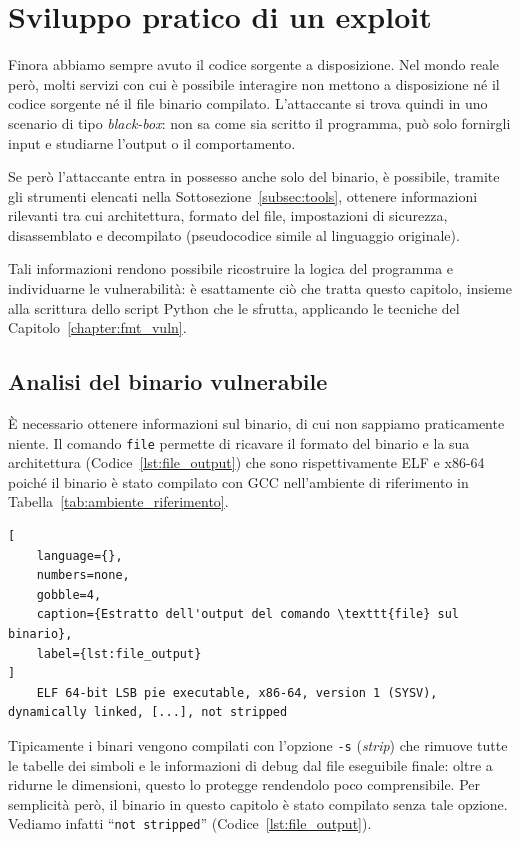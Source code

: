 \chapter{Sviluppo pratico di un exploit}\label{chapter:exploit}
Finora abbiamo sempre avuto il codice sorgente a disposizione. Nel mondo reale però, molti servizi con cui è possibile interagire non mettono a disposizione né il codice sorgente né il file binario compilato. L'attaccante si trova quindi in uno scenario di tipo \emph{black-box}: non sa come sia scritto il programma, può solo fornirgli input e studiarne l'output o il comportamento.

Se però l'attaccante entra in possesso anche solo del binario, è possibile, tramite gli strumenti elencati nella Sottosezione~\ref{subsec:tools}, ottenere informazioni rilevanti tra cui architettura, formato del file, impostazioni di sicurezza, disassemblato e decompilato (pseudocodice simile al linguaggio originale).

Tali informazioni rendono possibile ricostruire la logica del programma e individuarne le vulnerabilità: è esattamente ciò che tratta questo capitolo, insieme alla scrittura dello script Python che le sfrutta, applicando le tecniche del Capitolo~\ref{chapter:fmt_vuln}.


\section{Analisi del binario vulnerabile}\label{sec:vuln_service}
È necessario ottenere informazioni sul binario, di cui non sappiamo praticamente niente.
Il comando \texttt{file} permette di ricavare il formato del binario e la sua architettura (Codice~\ref{lst:file_output}) che sono rispettivamente ELF e x86-64 poiché il binario è stato compilato con GCC nell'ambiente di riferimento in Tabella~\ref{tab:ambiente_riferimento}.
\begin{lstlisting}[
    language={},
    numbers=none,
    gobble=4,
    caption={Estratto dell'output del comando \texttt{file} sul binario},
    label={lst:file_output}
]
    ELF 64-bit LSB pie executable, x86-64, version 1 (SYSV), dynamically linked, [...], not stripped
\end{lstlisting}

Tipicamente i binari vengono compilati con l'opzione \texttt{-s} (\emph{strip}) che rimuove tutte le tabelle dei simboli e le informazioni di debug dal file eseguibile finale: oltre a ridurne le dimensioni, questo lo protegge rendendolo poco comprensibile. Per semplicità però, il binario in questo capitolo è stato compilato senza tale opzione. Vediamo infatti ``\texttt{not stripped}'' (Codice~\ref{lst:file_output}).

